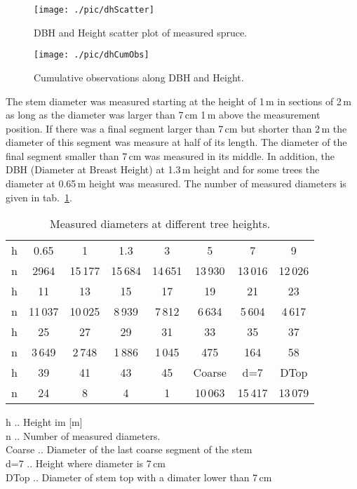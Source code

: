 \documentclass[twocolumn]{scrartcl}
\begin{document}
\begin{figure}[htbp]
  \centering
  \texttt{[image: ./pic/dhScatter]}
  \caption{DBH and Height scatter plot of measured spruce.}
  \label{fig:dhScatter}
\end{figure}

\begin{figure}[htbp]
  \centering
  \texttt{[image: ./pic/dhCumObs]}
  \caption{Cumulative observations along DBH and Height.}
  \label{fig:dhCumObs}
\end{figure}

The stem diameter was measured starting at the height of 1\,m in sections of
2\,m as long as the diameter was larger than 7\,cm 1\,m above the measurement
position. If there was a final segment larger than 7\,cm but shorter than 2\,m
the diameter of this segment was measure at half of its length. The diameter of
the final segment smaller than 7\,cm was measured in its middle. In addition,
the DBH (Diameter at Breast Height) at 1.3\,m height and for some trees the
diameter at 0.65\,m height was measured. The number of measured diameters is
given in tab.~\ref{tab:nDiamAtHeight}.

\begin{table}[htbp]
  \centering
  \begin{tabular}{l *{7}{c@{~~}}}
    h & 0.65 & 1 & 1.3 & 3 & 5 & 7 & 9 \\
    n & 2964 & 15\,177 & 15\,684 & 14\,651 & 13\,930 & 13\,016 & 12\,026\\
    \hline
    h & 11 & 13 & 15 & 17 & 19 & 21 & 23 \\
    n & 11\,037 & 10\,025 & 8\,939 & 7\,812 & 6\,634 & 5\,604 & 4\,617\\
    \hline
    h & 25 & 27 & 29 & 31 & 33 & 35 & 37\\
    n & 3\,649 & 2\,748 & 1\,886 & 1\,045 & 475 & 164 & 58\\
    \hline
    h & 39 & 41 & 43 & 45 & Coarse & d=7 & DTop \\
    n & 24 & 8 & 4 & 1 & 10\,063 & 15\,417 & 13\,079\\
  \end{tabular}
  \caption{Measured diameters at different tree heights.}
  \label{tab:nDiamAtHeight}
  \raggedright
  \footnotesize{h .. Height im [m]\\
  n .. Number of measured diameters.\\
  Coarse .. Diameter of the last coarse segment of the stem\\
  d=7 .. Height where diameter is 7\,cm\\
  DTop .. Diameter of stem top with a dimater lower than 7\,cm}
\end{table}
\end{document}
